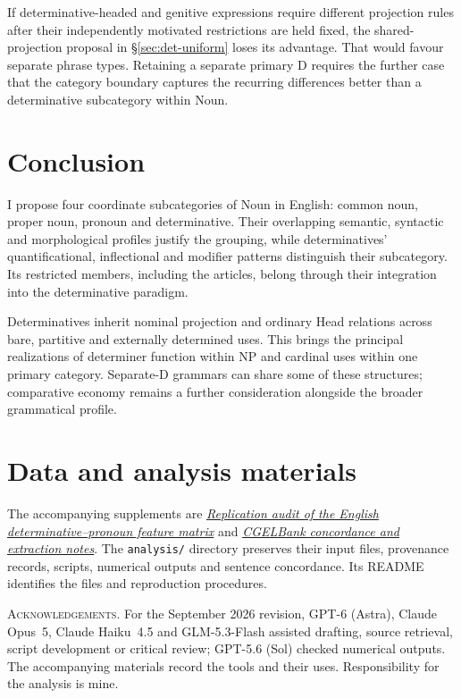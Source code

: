 \documentclass[12pt]{article}
\begin{document}
If determinative-headed and genitive expressions require different projection rules after their independently motivated restrictions are held fixed, the shared-projection proposal in §\ref{sec:det-uniform} loses its advantage. That would favour separate phrase types. Retaining a separate primary D requires the further case that the category boundary captures the recurring differences better than a determinative subcategory within Noun.

\section{Conclusion}\label{sec:conclusion}

I propose four coordinate subcategories of Noun in English: common noun, proper noun, pronoun and determinative. Their overlapping semantic, syntactic and morphological profiles justify the grouping, while determinatives' quantificational, inflectional and modifier patterns distinguish their subcategory. Its restricted members, including the articles, belong through their integration into the determinative paradigm.

Determinatives inherit nominal projection and ordinary Head relations across bare, partitive and externally determined uses. This brings the principal realizations of determiner function within NP and cardinal uses within one primary category. Separate-D grammars can share some of these structures; comparative economy remains a further consideration alongside the broader grammatical profile.

\section*{Data and analysis materials}

The accompanying supplements are \href{run:matrix-audit.pdf}{\textit{Replication audit of the English determinative--pronoun feature matrix}} and \href{run:corpus-documentation.pdf}{\textit{CGELBank concordance and extraction notes}}. The \texttt{analysis/} directory preserves their input files, provenance records, scripts, numerical outputs and sentence concordance. Its README identifies the files and reproduction procedures.

\vspace{0.5\baselineskip}
\noindent\textsc{Acknowledgements.} For the September 2026 revision, GPT-6 (Astra), Claude Opus~5, Claude Haiku~4.5 and GLM-5.3-Flash assisted drafting, source retrieval, script development or critical review; GPT-5.6 (Sol) checked numerical outputs. The accompanying materials record the tools and their uses. Responsibility for the analysis is mine.

\clearpage
\printbibliography
\end{document}
